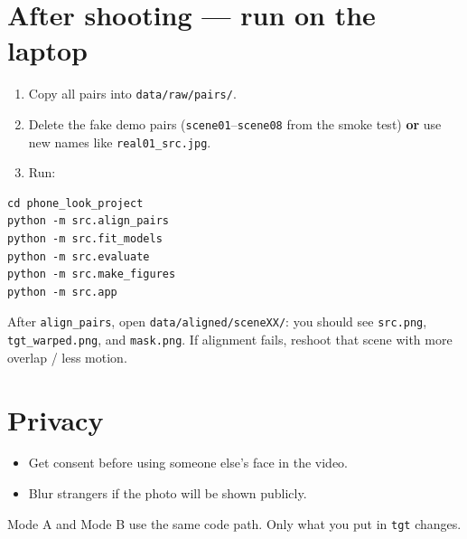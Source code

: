 \documentclass[11pt,a4paper]{article}
\begin{document}
\section{After shooting --- run on the laptop}
\begin{enumerate}
  \item Copy all pairs into \texttt{data/raw/pairs/}.
  \item Delete the fake demo pairs (\texttt{scene01}--\texttt{scene08} from the smoke test) \textbf{or} use new names like \texttt{real01\_src.jpg}.
  \item Run:
\end{enumerate}
\begin{verbatim}
cd phone_look_project
python -m src.align_pairs
python -m src.fit_models
python -m src.evaluate
python -m src.make_figures
python -m src.app
\end{verbatim}

\begin{tcolorbox}[colback=white,colframe=ok,title=Quick sanity check]
After \texttt{align\_pairs}, open \texttt{data/aligned/sceneXX/}: you should see \texttt{src.png}, \texttt{tgt\_warped.png}, and \texttt{mask.png}. If alignment fails, reshoot that scene with more overlap / less motion.
\end{tcolorbox}

\section{Privacy}
\begin{itemize}
  \item Get consent before using someone else's face in the video.
  \item Blur strangers if the photo will be shown publicly.
\end{itemize}

\vspace{0.6em}
\begin{center}
\small\textcolor{muted}{Mode A and Mode B use the same code path. Only what you put in \texttt{tgt} changes.}
\end{center}
\end{document}
